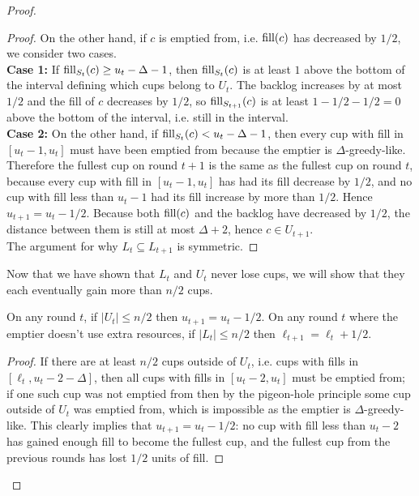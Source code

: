 \begin{proof}
\begin{proof}
    On the other hand, if $c$ is emptied from, i.e. $\operatorname{\textnormal{fill}}(c)$ has decreased by
    $1/2$, we consider two cases.\\
    \textbf{Case 1:} If $\operatorname{\textnormal{fill}}_{S_t}(c) \ge u_t-\Delta -1$, then
    $\operatorname{\textnormal{fill}}_{S_t}(c)$ is at least $1$ above the bottom of the
    interval defining which cups belong to $U_t$. The backlog
    increases by at most $1/2$ and the fill of $c$ decreases by $1/2$, so
    $\operatorname{\textnormal{fill}}_{S_{t+1}}(c)$ is at least $1-1/2-1/2 = 0$ above the bottom of the
    interval, i.e. still in the interval. \\
    \textbf{Case 2:} On the other hand, if $\operatorname{\textnormal{fill}}_{S_t}(c) <
    u_t-\Delta-1$, then every cup with fill in $[u_t-1, u_t]$
    must have been emptied from because the emptier is
    $\Delta$-greedy-like. Therefore the fullest cup
    on round $t+1$ is the same as the fullest cup on round $t$,
    because every cup with fill in $[u_t-1, u_t]$
    has had its fill decrease by $1/2$, and no cup with fill less than
    $u_t-1$ had its fill increase by more than $1/2$. Hence $u_{t+1}
    = u_t -1/2$. Because both $\operatorname{\textnormal{fill}}(c)$ and the backlog
    have decreased by $1/2$, the distance between them is
    still at most $\Delta+2$, hence $c\in U_{t+1}$.\\
    The argument for why $L_t \subseteq L_{t+1}$ is symmetric.
  \end{proof}

  Now that we have shown that $L_t$ and $U_t$ never lose cups, we will show
  that they each eventually gain more than $n/2$ cups.

  \begin{clm}
    \label{clm:howDoLandUchange}
    On any round $t$, if $|U_t| \le n/2$ then $u_{t+1} = u_t - 1/2$.
    On any round $t$ where the emptier doesn't use extra resources, if
    $|L_t| \le n/2$ then $\ell_{t+1} = \ell_t+ 1/2$.
  \end{clm}
  \begin{proof}
    If there are at least $n/2$ cups outside of $U_t$, i.e. cups
    with fills in $[\ell_t, u_t-2-\Delta]$, then all cups with
    fills in $[u_t - 2, u_t]$ must be emptied from; if one such cup
    was not emptied from then by the pigeon-hole principle some
    cup outside of $U_t$ was emptied from, which is impossible as
    the emptier is $\Delta$-greedy-like.
    This clearly implies that $u_{t+1} = u_t - 1/2$: no cup with fill
    less than $u_t-2$ has gained enough fill to become the fullest
    cup, and the fullest cup from the previous rounds has lost $1/2$
    units of fill.


\end{proof}
\end{proof}
